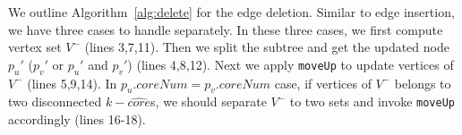 We outline Algorithm~\ref{alg:delete} for the edge deletion. Similar to edge insertion, we have three cases to handle separately. In these three cases, we first compute vertex set $V^-$ (lines 3,7,11). Then we split the subtree and get the updated node $p_u'$ ($p_v'$ or $p_u'$ and $p_v'$) (lines 4,8,12). Next we apply {\tt moveUp} to update vertices of $V^-$ (lines 5,9,14). In $p_u.coreNum = p_v.coreNum$ case, if vertices of $V^-$ belongs to two disconnected $k-\widehat{core}$s, we should separate $V^-$ to two sets and invoke {\tt moveUp} accordingly (lines 16-18).



